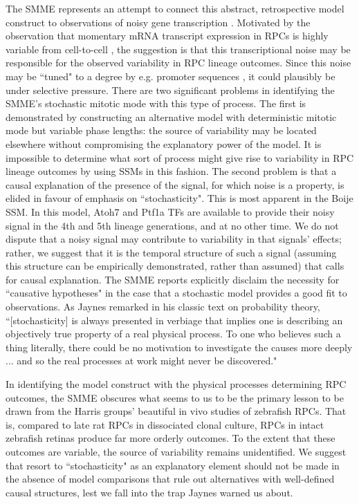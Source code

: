 The SMME represents an attempt to connect this abstract, retrospective model construct to observations of noisy gene transcription \cite{Raj2008}. Motivated by the observation that momentary mRNA transcript expression in RPCs is highly variable from cell-to-cell \cite{Trimarchi2008}, the suggestion is that this transcriptional noise may be responsible for the observed variability in RPC lineage outcomes. Since this noise may be ``tuned" to a degree by e.g. promoter sequences \cite{Raser2004}, it could plausibly be under selective pressure. There are two significant problems in identifying the SMME's stochastic mitotic mode with this type of process. The first is demonstrated by constructing an alternative model with deterministic mitotic mode but variable phase lengths: the source of variability may be located elsewhere without compromising the explanatory power of the model. It is impossible to determine what sort of process might give rise to variability in RPC lineage outcomes by using SSMs in this fashion. The second problem is that a causal explanation of the presence of the signal, for which noise is a property, is elided in favour of emphasis on ``stochasticity". This is most apparent in the Boije SSM. In this model, Atoh7 and Ptf1a TFs are available to provide their noisy signal in the 4th and 5th lineage generations, and at no other time. We do not dispute that a noisy signal may contribute to variability in that signals' effects; rather, we suggest that it is the temporal structure of such a signal (assuming this structure can be empirically demonstrated, rather than assumed) that calls for causal explanation. The SMME reports explicitly disclaim the necessity for ``causative hypotheses" in the case that a stochastic model provides a good fit to observations. As Jaynes remarked in his classic text on probability theory, ``[stochasticity] is always presented in verbiage that implies one is describing an objectively true property of a real physical process. To one who believes such a thing literally, there could be no motivation to investigate the causes more deeply ... and so the real processes at work might never be discovered." \cite{Jaynes2003} 

In identifying the model construct with the physical processes determining RPC outcomes, the SMME obscures what seems to us to be the primary lesson to be drawn from the Harris groups' beautiful in vivo studies of zebrafish RPCs. That is, compared to late rat RPCs in dissociated clonal culture, RPCs in intact zebrafish retinas produce far more orderly outcomes. To the extent that these outcomes are variable, the source of variability remains unidentified. We suggest that resort to ``stochasticity" as an explanatory element should not be made in the absence of model comparisons that rule out alternatives with well-defined causal structures, lest we fall into the trap Jaynes warned us about.